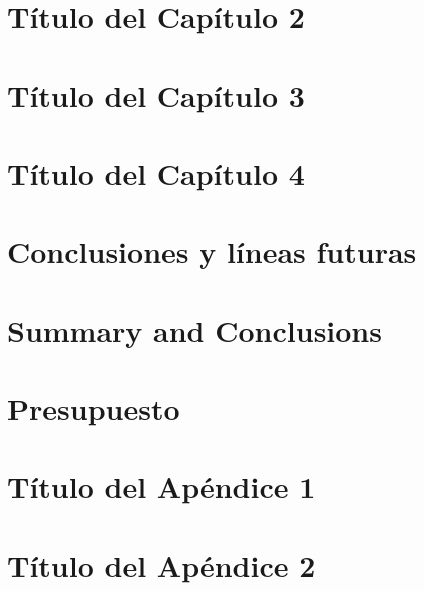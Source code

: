\documentclass[a4paper,12pt,oneside]{scrbook}
\begin{document}


\chapter{Título del Capítulo 2}
\label{chapter:dos}



\chapter{Título del Capítulo 3}
\label{chapter:tres}



\chapter{Título del Capítulo 4}
\label{chapter:cuatro}



\chapter{Conclusiones y líneas futuras}
\label{chapter:Resultados}



\chapter{Summary and Conclusions}
\label{chapter:Conclusiones}



\chapter{Presupuesto}
\label{chapter:presupuesto}



\appendix

\chapter{Título del Apéndice 1}
\label{appendix:1}


\chapter{Título del Apéndice 2}
\label{appendix:2}


\backmatter

\end{document}
